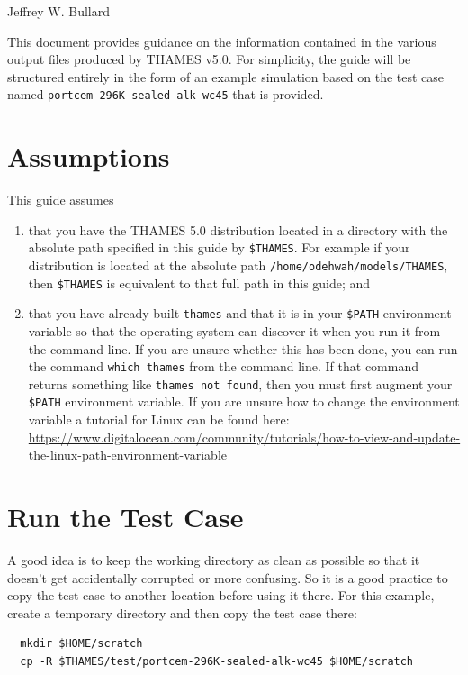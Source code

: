 \documentclass{article}
\begin{document}
\lstset{language=XML,stringstyle=\ttfamily}

\begin{center}
	\Large{\textbf{}}
\end{center}
\begin{center}
	\large{Jeffrey W. Bullard}
\end{center}
\begin{center}
	\large{\DTMnow}
\end{center}

\vspace{0.25truein}
\tableofcontents

\vspace{0.25truein}
This document provides guidance on the information contained in the various output files
produced by THAMES v5.0. For simplicity, the guide will be structured entirely
in the form of an example simulation based on the test case named
\verb!portcem-296K-sealed-alk-wc45! that is provided.

\section{\label{sec:assumption} Assumptions}
This guide assumes
\begin{enumerate}
	\item that you have the THAMES 5.0 distribution located in a directory
	      with the absolute path specified in this guide by \verb!$THAMES!. For example
	      if your distribution is located at the absolute path
	      \verb!/home/odehwah/models/THAMES!, then \verb!$THAMES! is equivalent to that
	      full path in this guide; and
	\item that you have already built \verb!thames! and that it is in
	      your \verb!$PATH! environment variable so that the operating system can discover it
	      when you run it from the command line. If you are unsure whether this has been
	      done, you can run the command \verb!which thames! from the command line. If that
	      command returns something like \verb!thames not found!, then you must first
	      augment your \verb!$PATH! environment variable. If you are unsure how to
	      change the environment variable a tutorial for Linux can be found
	      here: \url{https://www.digitalocean.com/community/tutorials/how-to-view-and-update-the-linux-path-environment-variable}
\end{enumerate}

\section{\label{sec:categories} Run the Test Case}
A good idea is to keep the working directory as clean as possible so that it
doesn't get accidentally corrupted or more confusing. So it is a good practice
to copy the test case to another location before using it there. For this
example, create a temporary directory and then copy the test case there:
\scriptsize{
	\begin{lstlisting}
  mkdir $HOME/scratch
  cp -R $THAMES/test/portcem-296K-sealed-alk-wc45 $HOME/scratch
\end{lstlisting}
}
\end{document}
